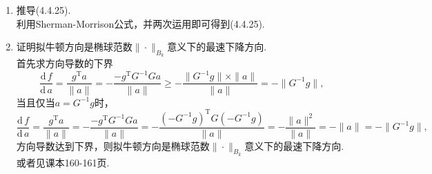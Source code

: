 \begin{enumerate}
    \item 推导(4.4.25).\\
    \sol 利用Sherman-Morrison公式，并两次运用即可得到(4.4.25).
    \item 证明拟牛顿方向是椭球范数$\|\cdot\|_{B_k}$意义下的最速下降方向.\\
    \pro 首先求方向导数的下界
    \[\frac{\mathrm{d}\,f}{\mathrm{d}\,a}=\frac{g^\mathrm{T}a}{\|a\|}=-\frac{-g^\mathrm{T}G^{-1}Ga}{\|a\|} \geqslant -\frac{\|G^{-1}g\|\times\|a\|}{\|a\|}=-\|G^{-1}g\|,\]
    当且仅当$a=G^{-1}g$时，
    \[\frac{\mathrm{d}\,f}{\mathrm{d}\,a}=\frac{g^\mathrm{T}a}{\|a\|}=-\frac{-g^\mathrm{T}G^{-1}Ga}{\|a\|}=-\frac{(-G^{-1}g)^\mathrm{T}G(-G^{-1}g)}{\|a\|}=-\frac{\|a\|^2}{\|a\|}=-\|a\|=-\|G^{-1}g\|,\]
    方向导数达到下界，则拟牛顿方向是椭球范数$\|\cdot\|_{B_k}$意义下的最速下降方向.\\
    或者见课本160-161页.
\end{enumerate}
\clearpage
